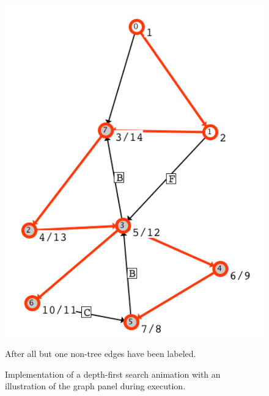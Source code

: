 \begin{figure}
\begin{minipage}{0.49\textwidth}
\includegraphics[scale=0.5]{X_dfs_d_2}

After all but one non-tree edges have been labeled.

\end{minipage}
\caption{Implementation of a depth-first search animation
  with an illustration of the graph panel during execution.}
\label{fig:dfs}
\end{figure}
